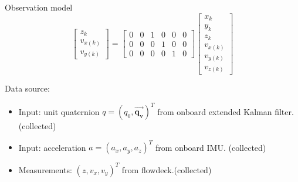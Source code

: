 \documentclass{cisXXX} %
\begin{document}
Observation model
\begin{equation}
\begin{bmatrix}
z_k     \\
v_{x(k)}  \\
v_{y(k)}
\end{bmatrix} = \begin{bmatrix}
0  & 0  & 1  & 0  & 0  & 0    \\
0  & 0  & 0  & 1  & 0  & 0    \\
0  & 0  & 0  & 0  & 1  & 0    
\end{bmatrix}\begin{bmatrix}
x_k \\
y_k \\
z_k \\
v_{x(k)} \\
v_{y(k)} \\
v_{z(k)}
\end{bmatrix}
\end{equation}

Data source:
\begin{itemize}
\item Input: unit quaternion $q=(q_0, \bm{\vec{q_v}})^T$ from onboard extended Kalman filter. (collected)

\item Input: acceleration $a=(a_x, a_y, a_z)^T$ from onboard IMU. (collected)
\item Measurements: $(z, v_x,v_y)^T$ from flowdeck.(collected)
\end{itemize}
\end{document}
